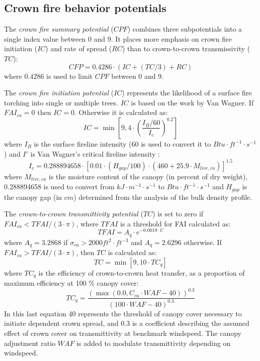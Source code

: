 \documentclass[]{book}
\begin{document}
\hypertarget{crown-fire-behavior-potentials}{%
\subsection{Crown fire behavior potentials}\label{crown-fire-behavior-potentials}}

The \emph{crown fire summary potential} (\(CPF\)) combines three subpotentials into a single index value between 0 and 9. It places more emphasis on crown fire initiation (\(IC\)) and rate of spread (\(RC\)) than to crown-to-crown transmissivity (\(TC\)):
\begin{equation}
CFP = 0.4286 \cdot (IC+(TC/3)+RC)
\end{equation}
where \(0.4286\) is used to limit \(CPF\) between 0 and 9.

The \emph{crown fire initiation potential} (\(IC\)) represents the likelihood of a surface fire torching into single or multiple trees. \(IC\) is based on the work by Van Wagner. If \(FAI_{ca} = 0\) then \(IC = 0\). Otherwise it is calculated as:
\begin{equation}
IC = \min \left[ 9, 4 \cdot \left(\frac{I_B/60}{I_c}\right)^{0.2}\right]
\end{equation}
where \(I_B\) is the surface fireline intensity (60 is used to convert it to \(Btu\cdot ft^{-1} \cdot s^{-1}\)) and \(I'\) is Van Wagner's critical fireline intensity \citep{Scott2002}:
\begin{equation}
I_c = 0.288894658 \cdot \left[ 0.01\cdot (H_{gap}/100) \cdot (460 +25.9\cdot M_{live, ca})\right]^{1.5}
\end{equation}
where \(M_{live, ca}\) is the moisture content of the canopy (in percent of dry weight), 0.288894658 is used to convert from \(kJ \cdot m^{-1}\cdot s^{-1}\) to \(Btu \cdot ft^{-1}\cdot s^{-1}\) and \(H_{gap}\) is the canopy gap (in \(cm\)) determined from the analysis of the bulk density profile.

The \emph{crown-to-crown transmittivity potential} (\(TC\)) is set to zero if \(FAI_{ca} < TFAI/(3\cdot \pi)\), where \(TFAI\) is a threshold for FAI calculated as:
\begin{equation}
TFAI = A_{q}\cdot e^{-0.0019 \cdot U}
\end{equation}
where \(A_{q} = 3.2868\) if \(\sigma_{ca} > 2000 ft^{2}\cdot ft^{-3}\) and \(A_{q} = 2.6296\) otherwise. If \(FAI_{ca} > TFAI/(3\cdot \pi)\), then \(TC\) is calculated as:
\begin{equation}
TC = \min \left[ 9, 10 \cdot TC_q \right]
\end{equation}
where \(TC_q\) is the efficiency of crown-to-crown heat transfer, as a proportion of maximum efficiency at 100 \% canopy cover:
\begin{equation}
TC_q = \frac{(\max(0.0, C_{ca}\cdot WAF - 40))^{0.3}}{(100 \cdot WAF -40)^{0.3}}
\end{equation}
In this last equation 40 represents the threshold of canopy cover necessary to initiate dependent crown spread, and 0.3 is a coefficient describing the assumed effect of crown cover on transmittivity at benchmark windspeed. The canopy adjustment ratio \(WAF\) is added to modulate transmittivity depending on windspeed.
\end{document}
